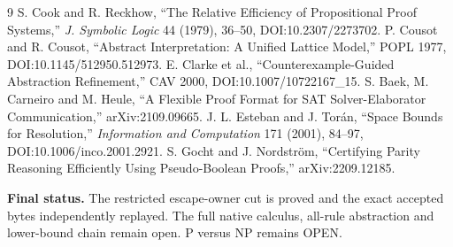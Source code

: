 \documentclass[11pt]{article}
\begin{document}
\begin{thebibliography}{9}
 S. Cook and R. Reckhow, ``The Relative Efficiency of
Propositional Proof Systems,'' \emph{J. Symbolic Logic} 44 (1979), 36--50,
DOI:10.2307/2273702.
 P. Cousot and R. Cousot, ``Abstract Interpretation: A Unified
Lattice Model,'' POPL 1977, DOI:10.1145/512950.512973.
 E. Clarke et al., ``Counterexample-Guided Abstraction
Refinement,'' CAV 2000, DOI:10.1007/10722167\_15.
 S. Baek, M. Carneiro and M. Heule, ``A Flexible Proof Format
for SAT Solver-Elaborator Communication,'' arXiv:2109.09665.
 J. L. Esteban and J. Tor\'an, ``Space Bounds for Resolution,''
\emph{Information and Computation} 171 (2001), 84--97,
DOI:10.1006/inco.2001.2921.
 S. Gocht and J. Nordstr\"om, ``Certifying Parity Reasoning
Efficiently Using Pseudo-Boolean Proofs,'' arXiv:2209.12185.
\end{thebibliography}

\noindent\textbf{Final status.} The restricted escape-owner cut is proved and
the exact accepted bytes independently replayed. The full native calculus,
all-rule abstraction and lower-bound chain remain open. P versus NP remains
OPEN.
\end{document}

